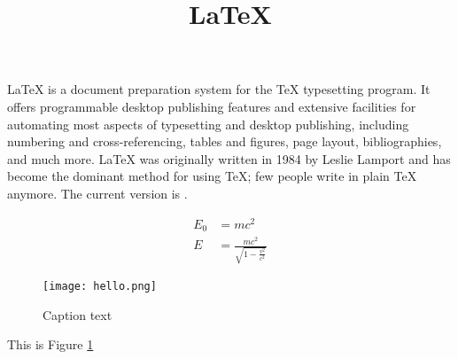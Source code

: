 \documentclass{article} %
\title{\LaTeX}
\begin{document}
  \maketitle
  \LaTeX{} is a document preparation system for
  the \TeX{} typesetting program. It offers
  programmable desktop publishing features and
  extensive facilities for automating most
  aspects of typesetting and desktop publishing,
  including numbering and  cross-referencing,
  tables and figures, page layout,
  bibliographies, and much more. \LaTeX{} was
  originally written in 1984 by Leslie Lamport
  and has become the  dominant method for using
  \TeX; few people write in plain \TeX{} anymore.
  The current version is \LaTeXe.

  \begin{align}
    E_0 &= mc^2 \\
    E &= \frac{mc^2}{\sqrt{1-\frac{v^2}{c^2}}}
  \end{align}

  \begin{figure}[h!]
    \centering
    \texttt{[image: hello.png]}
    \caption{Caption text}
    \label{fig:ref-1}
  \end{figure}

  This is Figure \ref{fig:ref-1}
\end{document}
